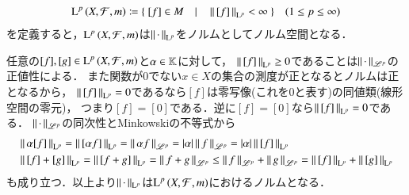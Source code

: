 \begin{qst}
\begin{lem}
	\begin{align}
		\operatorname{L}^{p} \left(X,\mathcal{F},m\right) \coloneqq \{\ [f] \in M \quad |\quad \left\|\, [f]\, \right\|_{\mathrm{L}^p} < \infty\ \} \quad (1 \leq p \leq \infty)
	\end{align}
	を定義すると，$\operatorname{L}^{p} \left(X,\mathcal{F},m\right)$は$\left\|\, \cdot\, \right\|_{\mathrm{L}^p}$をノルムとしてノルム空間となる．
\end{lem}
\begin{prf}
	任意の$[f],[g] \in \operatorname{L}^{p} \left(X,\mathcal{F},m\right)$と$\alpha \in \mathbb{K}$に対して，
	$\left\|\, [f]\, \right\|_{\mathrm{L}^p} \geq 0$であることは$\left\|\, \cdot\, \right\|_{\mathscr{L}^p}$の正値性による．
	また関数が0でない$x \in X$の集合の測度が正となるとノルムは正となるから，
	$\left\|\, [f]\, \right\|_{\mathrm{L}^p} = 0$であるなら$[f]$は零写像(これを0と表す)の同値類(線形空間の零元)，
	つまり$[f] = [0]$である．逆に$[f] = [0]$なら$\left\|\, [f]\, \right\|_{\mathrm{L}^p} = 0$である．
	$\left\|\, \cdot\, \right\|_{\mathscr{L}^p}$の同次性とMinkowskiの不等式から
	\begin{align}
		&\left\|\, \alpha[f]\, \right\|_{\mathrm{L}^p} = \left\|\, [\alpha f]\, \right\|_{\mathrm{L}^p} = \left\|\, \alpha f\, \right\|_{\mathscr{L}^p} = |\alpha|\left\|\, f\, \right\|_{\mathscr{L}^p} = |\alpha|\left\|\, [f]\, \right\|_{\mathrm{L}^p} \\
		&\left\|\, [f] + [g]\, \right\|_{\mathrm{L}^p} = \left\|\, [f + g]\, \right\|_{\mathrm{L}^p} = \left\|\, f + g\, \right\|_{\mathscr{L}^p} \leq \left\|\, f\, \right\|_{\mathscr{L}^p} + \left\|\, g\, \right\|_{\mathscr{L}^p} = \left\|\, [f]\, \right\|_{\mathrm{L}^p} + \left\|\, [g]\, \right\|_{\mathrm{L}^p}
	\end{align}
	も成り立つ．以上より$\left\|\, \cdot\, \right\|_{\mathrm{L}^p}$は$\operatorname{L}^{p} \left(X,\mathcal{F},m\right)$におけるノルムとなる．
	\QED
\end{prf}


\end{qst}
